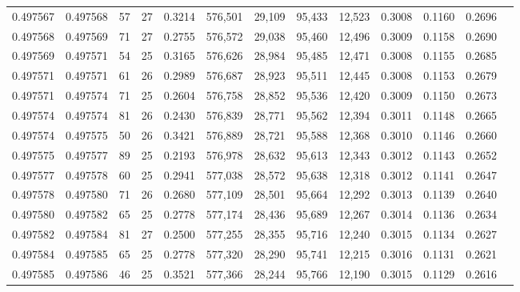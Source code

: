 \begin{tabular}{rrrrrrrrrrrrr}
0.497567 & 0.497568 &  57 &  27 &                                     0.3214 & 576,501 &  29,109 &  95,433 &  12,523 & 0.3008 & 0.1160 & 0.2696 \\
0.497568 & 0.497569 &  71 &  27 &                                     0.2755 & 576,572 &  29,038 &  95,460 &  12,496 & 0.3009 & 0.1158 & 0.2690 \\
0.497569 & 0.497571 &  54 &  25 &                                     0.3165 & 576,626 &  28,984 &  95,485 &  12,471 & 0.3008 & 0.1155 & 0.2685 \\
0.497571 & 0.497571 &  61 &  26 &                                     0.2989 & 576,687 &  28,923 &  95,511 &  12,445 & 0.3008 & 0.1153 & 0.2679 \\
0.497571 & 0.497574 &  71 &  25 &                                     0.2604 & 576,758 &  28,852 &  95,536 &  12,420 & 0.3009 & 0.1150 & 0.2673 \\
0.497574 & 0.497574 &  81 &  26 &                                     0.2430 & 576,839 &  28,771 &  95,562 &  12,394 & 0.3011 & 0.1148 & 0.2665 \\
0.497574 & 0.497575 &  50 &  26 &                                     0.3421 & 576,889 &  28,721 &  95,588 &  12,368 & 0.3010 & 0.1146 & 0.2660 \\
0.497575 & 0.497577 &  89 &  25 &                                     0.2193 & 576,978 &  28,632 &  95,613 &  12,343 & 0.3012 & 0.1143 & 0.2652 \\
0.497577 & 0.497578 &  60 &  25 &                                     0.2941 & 577,038 &  28,572 &  95,638 &  12,318 & 0.3012 & 0.1141 & 0.2647 \\
0.497578 & 0.497580 &  71 &  26 &                                     0.2680 & 577,109 &  28,501 &  95,664 &  12,292 & 0.3013 & 0.1139 & 0.2640 \\
0.497580 & 0.497582 &  65 &  25 &                                     0.2778 & 577,174 &  28,436 &  95,689 &  12,267 & 0.3014 & 0.1136 & 0.2634 \\
0.497582 & 0.497584 &  81 &  27 &                                     0.2500 & 577,255 &  28,355 &  95,716 &  12,240 & 0.3015 & 0.1134 & 0.2627 \\
0.497584 & 0.497585 &  65 &  25 &                                     0.2778 & 577,320 &  28,290 &  95,741 &  12,215 & 0.3016 & 0.1131 & 0.2621 \\
0.497585 & 0.497586 &  46 &  25 &                                     0.3521 & 577,366 &  28,244 &  95,766 &  12,190 & 0.3015 & 0.1129 & 0.2616 \\

\end{tabular}
